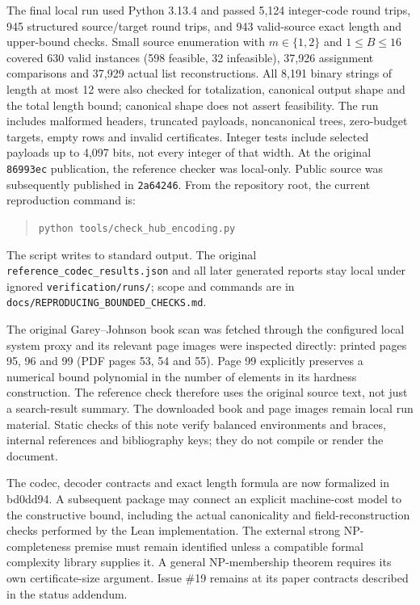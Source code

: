 \documentclass[11pt]{article}
\theoremstyle{remark}
\newcommand{\code}[1]{\nolinkurl{#1}}
\begin{document}
The final local run used Python 3.13.4 and passed 5,124 integer-code round
trips, 945 structured source/target round trips, and 943 valid-source exact
length and upper-bound checks. Small source enumeration with
$m\in\{1,2\}$ and $1\le B\le16$ covered 630 valid instances (598 feasible,
32 infeasible), 37,926 assignment comparisons and 37,929 actual list
reconstructions. All 8,191 binary strings of length at most 12 were also
checked for totalization, canonical output shape and the total length bound;
canonical shape does not assert feasibility. The run includes malformed
headers, truncated payloads, noncanonical trees, zero-budget targets,
empty rows and invalid certificates. Integer tests include selected
payloads up to 4,097 bits, not every integer of that width.
At the original \code{86993ec} publication, the reference checker was
local-only. Public source was subsequently published in \code{2a64246}.
From the repository root, the current reproduction command is:
\begin{quote}
\texttt{python tools/check\_hub\_encoding.py}
\end{quote}
The script writes to standard output. The original
\code{reference_codec_results.json} and all later generated reports stay
local under ignored \code{verification/runs/}; scope and commands are in
\code{docs/REPRODUCING_BOUNDED_CHECKS.md}.

The original Garey--Johnson book scan was fetched through the configured
local system proxy and its relevant page images were inspected directly:
printed pages 95, 96 and 99 (PDF pages 53, 54 and 55). Page 99 explicitly
preserves a numerical bound polynomial in the number of elements in its
hardness construction. The reference check therefore uses the original
source text, not just a search-result summary. The downloaded book and
page images remain local run material. Static checks of this note verify
balanced environments and braces, internal references and bibliography keys;
they do not compile or render the document.

The codec, decoder contracts and exact length formula are now formalized in
bd0dd94. A subsequent package may connect an explicit machine-cost model to
the constructive bound, including the actual canonicality and field-reconstruction
checks performed by the Lean implementation. The external
strong NP-completeness premise must remain identified unless a compatible
formal complexity library supplies it. A general NP-membership theorem
requires its own certificate-size argument. Issue \#19 remains at its
paper contracts described in the status addendum.
\end{document}
